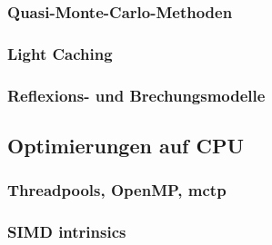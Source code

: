 \documentclass[crop=false]{standalone}
\begin{document}
      \subsubsection{Quasi-Monte-Carlo-Methoden} %
      \label{ssub:monte_carlo_methoden}


      \subsubsection{Light Caching} %
      \label{ssub:light_caching}


      \subsubsection{Reflexions- und Brechungsmodelle} %
      \label{ssub:reflexions_und_brechungsmodelle}


    \subsection{Optimierungen auf CPU} %
    \label{sub:optimierungen_auf_cpu}
      \subsubsection{Threadpools, OpenMP, mctp} %
      \label{ssub:threadpools}


      \subsubsection{SIMD intrinsics} %
      \label{ssub:simd_intrinsics}

\end{document}
